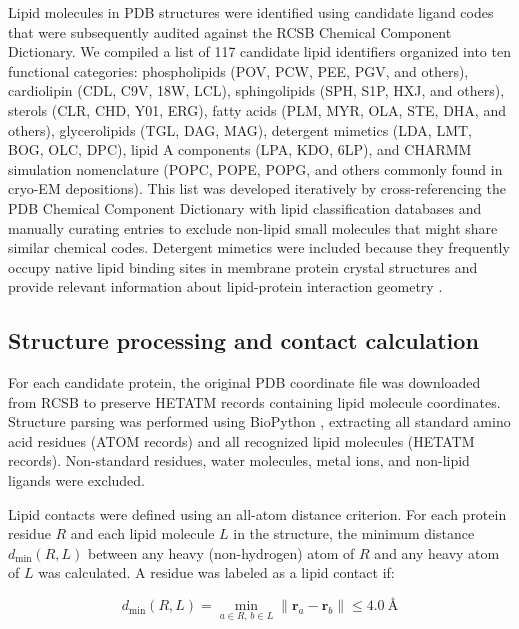 \documentclass[unnumsec,webpdf,contemporary,large]{oup-authoring-template}
\begin{document}
Lipid molecules in PDB structures were identified using candidate ligand codes that were subsequently audited against the RCSB Chemical Component Dictionary. We compiled a list of 117 candidate lipid identifiers organized into ten functional categories: phospholipids (POV, PCW, PEE, PGV, and others), cardiolipin (CDL, C9V, 18W, LCL), sphingolipids (SPH, S1P, HXJ, and others), sterols (CLR, CHD, Y01, ERG), fatty acids (PLM, MYR, OLA, STE, DHA, and others), glycerolipids (TGL, DAG, MAG), detergent mimetics (LDA, LMT, BOG, OLC, DPC), lipid A components (LPA, KDO, 6LP), and CHARMM simulation nomenclature (POPC, POPE, POPG, and others commonly found in cryo-EM depositions). This list was developed iteratively by cross-referencing the PDB Chemical Component Dictionary with lipid classification databases and manually curating entries to exclude non-lipid small molecules that might share similar chemical codes. Detergent mimetics were included because they frequently occupy native lipid binding sites in membrane protein crystal structures and provide relevant information about lipid-protein interaction geometry \cite{lee2004}.

\subsection{Structure processing and contact calculation}

For each candidate protein, the original PDB coordinate file was downloaded from RCSB to preserve HETATM records containing lipid molecule coordinates. Structure parsing was performed using BioPython \cite{cock2009}, extracting all standard amino acid residues (ATOM records) and all recognized lipid molecules (HETATM records). Non-standard residues, water molecules, metal ions, and non-lipid ligands were excluded.

Lipid contacts were defined using an all-atom distance criterion. For each protein residue $R$ and each lipid molecule $L$ in the structure, the minimum distance $d_{\min}(R, L)$ between any heavy (non-hydrogen) atom of $R$ and any heavy atom of $L$ was calculated. A residue was labeled as a lipid contact if:

\begin{equation}
d_{\min}(R, L) = \min_{a \in R,\, b \in L} \| \mathbf{r}_a - \mathbf{r}_b \| \leq 4.0~\text{\AA}
\label{eq:contact}
\end{equation}
\end{document}
